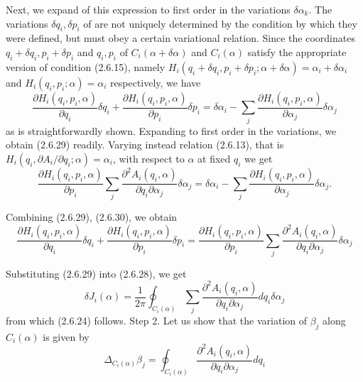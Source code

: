 \documentclass{article}
\begin{document}
Next, we expand of this expression to first order in the variations $\delta \alpha_{k}$.
The variations $\delta q_{i}, \delta p_{i}$ of are not uniquely determined by the condition by which they were defined, but must obey a certain variational relation. Since the coordinates $q_{i}+\delta q_{i}, p_{i}+\delta p_{i}$ and $q_{i}, p_{i}$ of $C_{i}(\alpha+\delta \alpha)$ and $C_{i}(\alpha)$ satisfy the appropriate version of condition (2.6.15), namely $H_{i}\left(q_{i}+\delta q_{i}, p_{i}+\delta p_{i} ; \alpha+\delta \alpha\right)=\alpha_{i}+\delta \alpha_{i}$ and $H_{i}\left(q_{i}, p_{i} ; \alpha\right)=\alpha_{i}$ respectively, we have
$$
\begin{equation*}
\frac{\partial H_{i}\left(q_{i}, p_{i}, \alpha\right)}{\partial q_{i}} \delta q_{i}+\frac{\partial H_{i}\left(q_{i}, p_{i}, \alpha\right)}{\partial p_{i}} \delta p_{i}=\delta \alpha_{i}-\sum_{j} \frac{\partial H_{i}\left(q_{i}, p_{i}, \alpha\right)}{\partial \alpha_{j}} \delta \alpha_{j} \tag{2.6.29}
\end{equation*}
$$
as is straightforwardly shown. Expanding to first order in the variations, we obtain (2.6.29) readily. Varying instead relation (2.6.13), that is $H_{i}\left(q_{i}, \partial A_{i} / \partial q_{i} ; \alpha\right)=\alpha_{i}$, with respect to $\alpha$ at fixed $q_{i}$ we get
$$
\begin{equation*}
\frac{\partial H_{i}\left(q_{i}, p_{i}, \alpha\right)}{\partial p_{i}} \sum_{j} \frac{\partial^{2} A_{i}\left(q_{i}, \alpha\right)}{\partial q_{i} \partial \alpha_{j}} \delta \alpha_{j}=\delta \alpha_{i}-\sum_{j} \frac{\partial H_{i}\left(q_{i}, p_{i}, \alpha\right)}{\partial \alpha_{j}} \delta \alpha_{j} . \tag{2.6.30}
\end{equation*}
$$

Combining (2.6.29), (2.6.30), we obtain
$$
\begin{equation*}
\frac{\partial H_{i}\left(q_{i}, p_{i}, \alpha\right)}{\partial q_{i}} \delta q_{i}+\frac{\partial H_{i}\left(q_{i}, p_{i}, \alpha\right)}{\partial p_{i}} \delta p_{i}=\frac{\partial H_{i}\left(q_{i}, p_{i}, \alpha\right)}{\partial p_{i}} \sum_{j} \frac{\partial^{2} A_{i}\left(q_{i}, \alpha\right)}{\partial q_{i} \partial \alpha_{j}} \delta \alpha_{j} \tag{2.6.31}
\end{equation*}
$$

Substituting (2.6.29) into (2.6.28), we get
$$
\begin{equation*}
\delta J_{i}(\alpha)=\frac{1}{2 \pi} \oint_{C_{i}(\alpha)} \sum_{j} \frac{\partial^{2} A_{i}\left(q_{i}, \alpha\right)}{\partial q_{i} \partial \alpha_{j}} d q_{i} \delta \alpha_{j} \tag{2.6.32}
\end{equation*}
$$
from which (2.6.24) follows.
Step 2. Let us show that the variation of $\beta_{j}$ along $C_{i}(\alpha)$ is given by
$$
\begin{equation*}
\Delta_{C_{i}(\alpha)} \beta_{j}=\oint_{C_{i}(\alpha)} \frac{\partial^{2} A_{i}\left(q_{i}, \alpha\right)}{\partial q_{i} \partial \alpha_{j}} d q_{i} \tag{2.6.33}
\end{equation*}
$$
\end{document}

